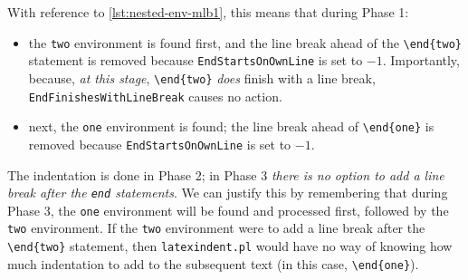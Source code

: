  With reference to \cref{lst:nested-env-mlb1}, this means that during Phase 1:
 \begin{itemize}
  \item the \texttt{two} environment is found first, and the line break ahead of the
        \lstinline!\end{two}! statement is removed because \texttt{EndStartsOnOwnLine} is
        set to $-1$. Importantly, because, \emph{at this stage}, \lstinline!\end{two}!
        \emph{does} finish with a line break, \texttt{EndFinishesWithLineBreak} causes no
        action.
  \item next, the \texttt{one} environment is found; the line break ahead of
        \lstinline!\end{one}! is removed because \texttt{EndStartsOnOwnLine} is set to
        $-1$.
 \end{itemize}
 The indentation is done in Phase 2; in Phase 3 \emph{there is no option to add a line
 break after the \lstinline!end! statements}. We can justify this by remembering that
 during Phase 3, the \texttt{one} environment will be found and processed first, followed
 by the \texttt{two} environment. If the \texttt{two} environment were to add a line
 break after the \lstinline!\end{two}! statement, then \texttt{latexindent.pl} would have
 no way of knowing how much indentation to add to the subsequent text (in this case,
 \lstinline!\end{one}!).

